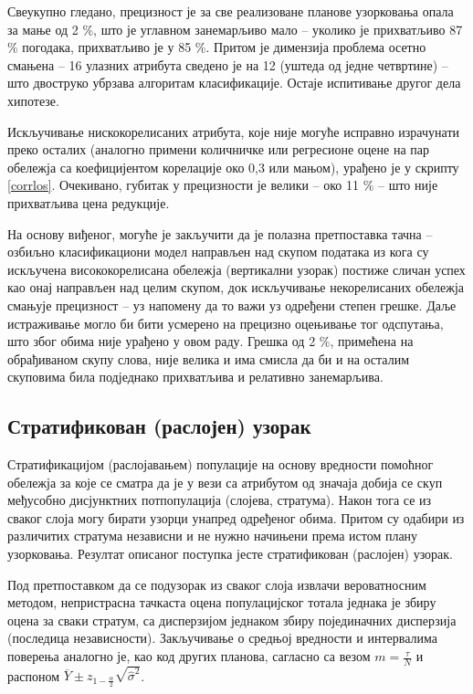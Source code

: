 \documentclass[a4paper]{article}
\begin{document}


Свеукупно гледано, прецизност је за све реализоване планове узорковања опала за мање од 2 \%, што је углавном занемарљиво мало -- уколико је прихватљиво 87 \% погодака, прихватљиво је у 85 \%. Притом је димензија проблема осетно смањена -- 16 улазних атрибута сведено је на 12 (уштеда од једне четвртине) -- што двоструко убрзава алгоритам класификације. Остаје испитивање другог дела хипотезе.

Искључивање нискокорелисаних атрибута, које није могуће исправно израчунати преко осталих (аналогно примени количничке или регресионе оцене на пар обележја са коефицијентом корелације око 0,3 или мањом), урађено је у скрипту \ref{corrlos}. Очекивано, губитак у прецизности је велики -- око 11 \% -- што није прихватљива цена редукције.



На основу виђеног, могуће је закључити да је полазна претпоставка тачна -- озбиљно класификациони модел направљен над скупом података из кога су искључена висококорелисана обележја (вертикални узорак) постиже сличан успех као онај направљен над целим скупом, док искључивање некорелисаних обележја смањује прецизност -- уз напомену да то важи уз одређени степен грешке. Даље истраживање могло би бити усмерено на прецизно оцењивање тог одспутања, што због обима није урађено у овом раду. Грешка од 2 \%, примећена на обрађиваном скупу слова, није велика и има смисла да би и на осталим скуповима била подједнако прихватљива и релативно занемарљива.

\subsection{Стратификован (раслојен) узорак}

Стратификацијом (раслојавањем) популације на основу вредности помоћног обележја за које се сматра да је у вези са атрибутом од значаја добија се скуп међусобно дисјунктних потпопулација (слојева, стратума). Након тога се из сваког слоја могу бирати узорци унапред одређеног обима. Притом су одабири из различитих стратума независни и не нужно начињени према истом плану узорковања. Резултат описаног поступка јесте стратификован (раслојен) узорак.\cite{prez7}

Под претпоставком да се подузорак из сваког слоја извлачи вероватносним методом, непристрасна тачкаста оцена популацијског тотала једнака је збиру оцена за сваки стратум, са дисперзијом једнаком збиру појединачних дисперзија (последица независности). Закључивање о средњој вредности и интервалима поверења аналогно је, као код других планова, сагласно са везом $m = \frac{\tau}{N}$ и распоном $\overline{Y} \pm z_{1 - \frac{\alpha}{2}}\sqrt{\hat{\sigma}^2}$.
\end{document}
